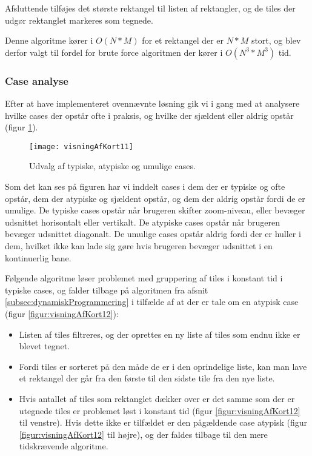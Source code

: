 Afsluttende tilføjes det største rektangel til listen af rektangler, og de tiles der udgør rektanglet markeres som tegnede.

Denne algoritme kører i $O(N * M)$ for et rektangel der er $N * M$ stort, og blev derfor valgt til fordel for brute force algoritmen der kører i $O(N^3 * M^3)$ tid.

\subsubsection{Case analyse}
\label{subsec:caseAnalyse}

Efter at have implementeret ovennævnte løsning gik vi i gang med at analysere hvilke cases der opstår ofte i praksis, og hvilke der sjældent eller aldrig opstår (figur \ref{figur:visningAfKort11}).

\begin{figure}[h]
	\centering
	\texttt{[image: visningAfKort11]}
	\captionsetup{width=0.8\textwidth}
	\caption{Udvalg af typiske, atypiske og umulige cases.}
	\label{figur:visningAfKort11}
\end{figure}

Som det kan ses på figuren har vi inddelt cases i dem der er typiske og ofte opstår, dem der atypiske og sjældent opstår, og dem der aldrig opstår fordi de er umulige. De typiske cases opstår når brugeren skifter zoom-niveau, eller bevæger udsnittet horisontalt eller vertikalt. De atypiske cases opstår når brugeren bevæger udsnittet diagonalt. De umulige cases opstår aldrig fordi der er huller i dem, hvilket ikke kan lade sig gøre hvis brugeren bevæger udsnittet i en kontinuerlig bane.

Følgende algoritme løser problemet med gruppering af tiles i konstant tid i typiske cases, og falder tilbage på algoritmen fra afsnit \ref{subsec:dynamiskProgrammering} i tilfælde af at der er tale om en atypisk case (figur \ref{figur:visningAfKort12}):

\begin{itemize}
	\item Listen af tiles filtreres, og der oprettes en ny liste af tiles som endnu ikke er blevet tegnet.
	\item Fordi tiles er sorteret på den måde de er i den oprindelige liste, kan man lave et rektangel der går fra den første til den sidste tile fra den nye liste.
	\item Hvis antallet af tiles som rektanglet dækker over er det samme som der er utegnede tiles er problemet løst i konstant tid (figur \ref{figur:visningAfKort12} til venstre). Hvis dette ikke er tilfældet er den pågældende case atypisk (figur \ref{figur:visningAfKort12} til højre), og der faldes tilbage til den mere tidskrævende algoritme.
\end{itemize}

